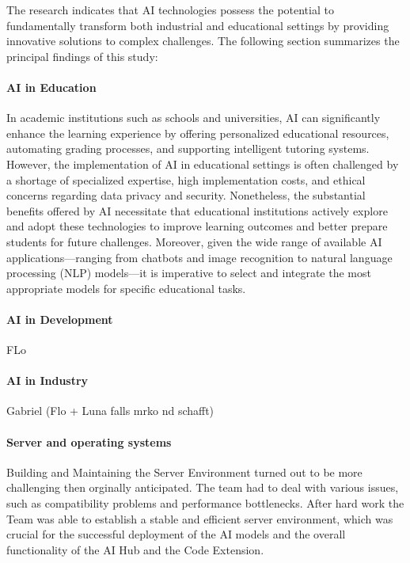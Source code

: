 The research indicates that AI technologies possess the potential to fundamentally transform both industrial and educational settings by providing innovative solutions 
to complex challenges. The following section summarizes the principal findings of this study:

\paragraph{AI in Education}

In academic institutions such as schools and universities, AI can significantly enhance the learning experience by offering personalized educational resources, 
automating grading processes, and supporting intelligent tutoring systems. However, the implementation of AI in educational settings is often challenged by a shortage of 
specialized expertise, high implementation costs, and ethical concerns regarding data privacy and security. Nonetheless, 
the substantial benefits offered by AI necessitate that educational institutions actively explore and adopt these technologies 
to improve learning outcomes and better prepare students for future challenges. Moreover, given the wide range of available AI applications—ranging from chatbots and image 
recognition to natural language processing (NLP) models—it is imperative to select and integrate the most appropriate models for specific educational tasks.

\paragraph{AI in Development}

FLo


\paragraph{AI in Industry}

Gabriel (Flo + Luna falls mrko nd schafft)

\paragraph{Server and operating systems}

Building and Maintaining the Server Environment turned out to be more challenging then orginally anticipated. The team had to deal with various issues, such as compatibility problems and performance bottlenecks.
After hard work the Team was able to establish a stable and efficient server environment, which was crucial for the successful deployment of the AI models and the overall functionality of the AI Hub and the Code Extension.

